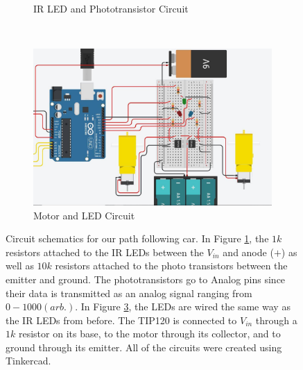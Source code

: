 \documentclass[twocolumn]{article}
\begin{document}
\begin{flushleft}
		\begin{figure}[H]

			{\begin{subfigure}[b]{0.45\textwidth}
				\caption{IR LED and Phototransistor Circuit}
				\label{fig:circuitSensors}
			\end{subfigure}\\ \vspace{1em}%
			\begin{subfigure}[b]{0.45\textwidth}
				\includegraphics[width=1\columnwidth, keepaspectratio]{CircuitMotors.jpg}
				\caption{Motor and LED Circuit}
				\label{fig:circuitMotors}
			\end{subfigure}
			
			\caption{Circuit schematics for our path following car. In Figure \ref{fig:circuitSensors}, the $1k$ resistors attached to the IR LEDs between the $V_{in}$ and anode ($+$) as well as $10k$ resistors attached to the photo transistors between the emitter and ground. The phototransistors go to Analog pins since their data is transmitted as an analog signal ranging from $0-1000 (arb.)$. In Figure \ref{fig:circuitMotors}, the LEDs are wired the same way as the IR LEDs from before. The TIP120 is connected to $V_{in}$ through a $1k$ resistor on its base, to the motor through its collector, and to ground through its emitter. All of the circuits were created using Tinkercad\cite{tinkercad}.}
			}
		\end{figure}
		

\end{flushleft}
\end{document}
